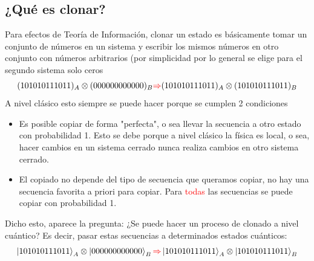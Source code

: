 \documentclass{book}
\begin{document}
\subsection{¿Qué es clonar?}
Para efectos de Teoría de Información, clonar un estado es básicamente tomar un conjunto de números en un sistema y escribir los mismos números en otro conjunto con números arbitrarios (por simplicidad por lo general se elige para el segundo sistema solo ceros
\begin{equation}\label{eq2.1} {(101010111011)_A\otimes(000000000000)_B\textcolor{red}{\Rightarrow}  (101010111011)_A\otimes(101010111011)_B }\end{equation}
A nivel clásico esto siempre se puede hacer porque se cumplen 2 condiciones
\begin{itemize}
    \item Es posible copiar de forma "perfecta", o sea llevar la secuencia a otro estado con probabilidad 1. Esto se debe porque a nivel clásico la física es local, o sea, hacer cambios en un sistema cerrado nunca realiza cambios en otro sistema cerrado. 
    \item El copiado no depende del tipo de secuencia que queramos copiar, no hay una secuencia favorita a priori para copiar. Para \textcolor{Red}{todas} las secuencias se puede copiar con probabilidad 1.
\end{itemize}

Dicho esto, aparece la pregunta: ¿Se puede hacer un proceso de clonado a nivel cuántico? Es decir, pasar estas secuencias a determinados estados cuánticos:
\begin{equation}\label{eq2.2}{ \ket{101010111011}_A\otimes\ket{000000000000}_B\textcolor{red}{\Rightarrow}  \ket{101010111011}_A\otimes\ket{101010111011}_B }\end{equation}
\end{document}
